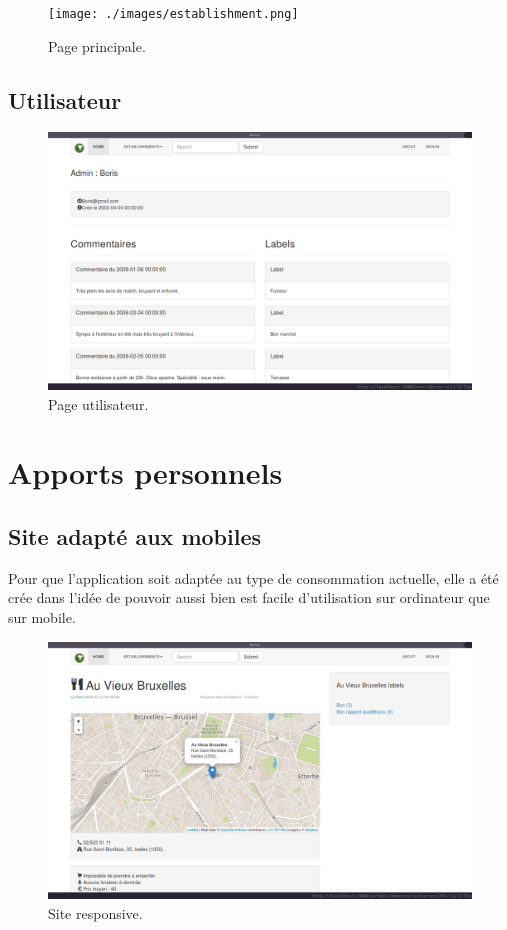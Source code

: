 \documentclass[a4paper,10pt]{article}
\begin{document}
\begin{figure}[h]
  \centering
  \texttt{[image: ./images/establishment.png]}
  \caption{Page principale.}
\end{figure}

\subsection{Utilisateur}
\begin{figure}[h]
  \centering
  \includegraphics[scale=0.2]{./images/user.png}
  \caption{Page utilisateur.}
\end{figure}

\section{Apports personnels}
\subsection{Site adapté aux mobiles}
    Pour que l'application soit adaptée au type de consommation actuelle, elle
    a été crée dans l'idée de pouvoir aussi bien est facile d'utilisation sur
    ordinateur que sur mobile.

    \begin{figure}[h]
        \centering
        \includegraphics[scale=0.2]{./images/responsive.png}
        \caption{Site responsive.}
    \end{figure}
\end{document}
